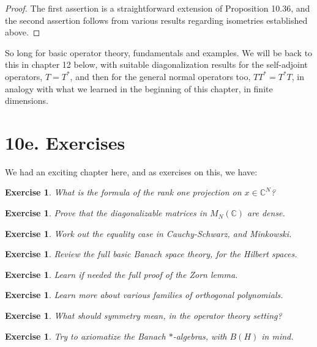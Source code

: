 \documentclass[12pt]{amsbook}
\newtheorem{exercise}[theorem]{Exercise}
\begin{document}
\begin{proof}
The first assertion is a straightforward extension of Proposition 10.36, and the second assertion follows from various results regarding isometries established above.
\end{proof}

So long for basic operator theory, fundamentals and examples. We will be back to this in chapter 12 below, with suitable diagonalization results for the self-adjoint operators, $T=T^*$, and then for the general normal operators too, $TT^*=T^*T$, in analogy with what we learned in the beginning of this chapter, in finite dimensions.

\section*{10e. Exercises}

We had an exciting chapter here, and as exercises on this, we have:

\begin{exercise}
What is the formula of the rank one projection on $x\in\mathbb C^N$?
\end{exercise}

\begin{exercise}
Prove that the diagonalizable matrices in $M_N(\mathbb C)$ are dense.
\end{exercise}

\begin{exercise}
Work out the equality case in Cauchy-Schwarz, and Minkowski.
\end{exercise}

\begin{exercise}
Review the full basic Banach space theory, for the Hilbert spaces.
\end{exercise}

\begin{exercise}
Learn if needed the full proof of the Zorn lemma.
\end{exercise}

\begin{exercise}
Learn more about various families of orthogonal polynomials.
\end{exercise}

\begin{exercise}
What should symmetry mean, in the operator theory setting?
\end{exercise}

\begin{exercise}
Try to axiomatize the Banach $*$-algebras, with $B(H)$ in mind.
\end{exercise}
\end{document}
